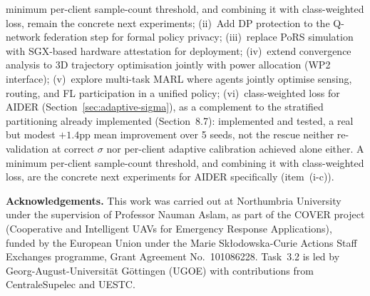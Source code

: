 \documentclass[12pt,a4paper]{article}
\begin{document}
minimum per-client sample-count threshold, and combining it with
class-weighted loss, remain the concrete next experiments;
(ii)~Add DP protection to the Q-network federation step for formal policy privacy;
(iii)~replace PoRS simulation with SGX-based hardware attestation for deployment;
(iv)~extend convergence analysis to 3D trajectory optimisation jointly with power
allocation (WP2 interface);
(v)~explore multi-task MARL where agents jointly optimise sensing, routing, and FL
participation in a unified policy;
(vi)~class-weighted loss for AIDER (Section~\ref{sec:adaptive-sigma}),
as a complement to the stratified partitioning already implemented
(Section~8.7): implemented and tested, a real but modest
$+1.4$pp mean improvement over 5 seeds, not the rescue neither
re-validation at correct $\sigma$ nor per-client adaptive calibration
achieved alone either. A minimum per-client sample-count threshold,
and combining it with class-weighted loss, are the concrete next
experiments for AIDER specifically (item~(i-c)).

\vspace{1em}
\noindent\textbf{Acknowledgements.}
This work was carried out at Northumbria University under the supervision of
Professor Nauman Aslam, as part of the COVER project
(Cooperative and Intelligent UAVs for Emergency Response Applications), funded
by the European Union under the Marie Sk\l{}odowska-Curie Actions Staff Exchanges
programme, Grant Agreement No.~101086228. Task~3.2 is led by
Georg-August-Universit\"at G\"ottingen (UGOE) with contributions from
CentraleSupelec and UESTC.



\end{document}
